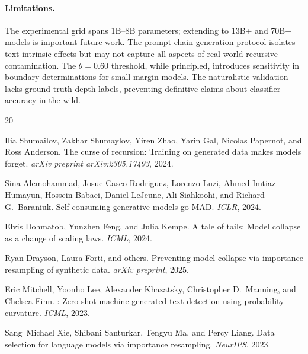 \documentclass[11pt,a4paper]{article}
\begin{document}
\paragraph{Limitations.}
The experimental grid spans 1B--8B parameters; extending to 13B+ and 70B+ models is important future work. The prompt-chain generation protocol isolates text-intrinsic effects but may not capture all aspects of real-world recursive contamination. The $\theta = 0.60$ threshold, while principled, introduces sensitivity in boundary determinations for small-margin models. The naturalistic validation lacks ground truth depth labels, preventing definitive claims about classifier accuracy in the wild.


\begin{thebibliography}{20}

Ilia Shumailov, Zakhar Shumaylov, Yiren Zhao, Yarin Gal, Nicolas Papernot, and Ross Anderson.
\newblock The curse of recursion: Training on generated data makes models forget.
\newblock \emph{arXiv preprint arXiv:2305.17493}, 2024.

Sina Alemohammad, Josue Casco-Rodriguez, Lorenzo Luzi, Ahmed Imtiaz Humayun, Hossein Babaei, Daniel LeJeune, Ali Siahkoohi, and Richard G.~Baraniuk.
\newblock Self-consuming generative models go {MAD}.
\newblock \emph{ICLR}, 2024.

Elvis Dohmatob, Yunzhen Feng, and Julia Kempe.
\newblock A tale of tails: Model collapse as a change of scaling laws.
\newblock \emph{ICML}, 2024.

Ryan Drayson, Laura Forti, and others.
\newblock Preventing model collapse via importance resampling of synthetic data.
\newblock \emph{arXiv preprint}, 2025.

Eric Mitchell, Yoonho Lee, Alexander Khazatsky, Christopher D.~Manning, and Chelsea Finn.
: Zero-shot machine-generated text detection using probability curvature.
\newblock \emph{ICML}, 2023.

Sang~Michael Xie, Shibani Santurkar, Tengyu Ma, and Percy Liang.
\newblock Data selection for language models via importance resampling.
\newblock \emph{NeurIPS}, 2023.

\end{thebibliography}
\end{document}
